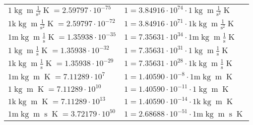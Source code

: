 \begin{center}
\begin{longtable}{l l}
{\color{black}$1 \bm{\mathrm{ }}\operatorname{kg}{\operatorname{m}}\frac1{\operatorname{s}^2}{}{\operatorname{K}} = 2.59797\cdot10^{-75} $}   & {\color{black}$ 1 = 3.84916\cdot10^{74} \cdot 1 \bm{\mathrm{ }}\operatorname{kg}{\operatorname{m}}\frac1{\operatorname{s}^2}{}{\operatorname{K}}$}  \\
{\color{gray}$1 \bm{\mathrm{ k}}\operatorname{kg}{\operatorname{m}}\frac1{\operatorname{s}^2}{}{\operatorname{K}} = 2.59797\cdot10^{-72} $}   & {\color{gray}$ 1 = 3.84916\cdot10^{71} \cdot 1 \bm{\mathrm{ k}}\operatorname{kg}{\operatorname{m}}\frac1{\operatorname{s}^2}{}{\operatorname{K}}$}  \\
{\color{gray}$1 \bm{\mathrm{ m}}\operatorname{kg}{\operatorname{m}}\frac1{\operatorname{s}}{}{\operatorname{K}} = 1.35938\cdot10^{-35} $}   & {\color{gray}$ 1 = 7.35631\cdot10^{34} \cdot 1 \bm{\mathrm{ m}}\operatorname{kg}{\operatorname{m}}\frac1{\operatorname{s}}{}{\operatorname{K}}$}  \\
{\color{black}$1 \bm{\mathrm{ }}\operatorname{kg}{\operatorname{m}}\frac1{\operatorname{s}}{}{\operatorname{K}} = 1.35938\cdot10^{-32} $}   & {\color{black}$ 1 = 7.35631\cdot10^{31} \cdot 1 \bm{\mathrm{ }}\operatorname{kg}{\operatorname{m}}\frac1{\operatorname{s}}{}{\operatorname{K}}$}  \\
{\color{gray}$1 \bm{\mathrm{ k}}\operatorname{kg}{\operatorname{m}}\frac1{\operatorname{s}}{}{\operatorname{K}} = 1.35938\cdot10^{-29} $}   & {\color{gray}$ 1 = 7.35631\cdot10^{28} \cdot 1 \bm{\mathrm{ k}}\operatorname{kg}{\operatorname{m}}\frac1{\operatorname{s}}{}{\operatorname{K}}$}  \\
{\color{gray}$1 \bm{\mathrm{ m}}\operatorname{kg}{\operatorname{m}}{}{}{\operatorname{K}} = 7.11289\cdot10^{7} $}   & {\color{gray}$ 1 = 1.40590\cdot10^{-8} \cdot 1 \bm{\mathrm{ m}}\operatorname{kg}{\operatorname{m}}{}{}{\operatorname{K}}$}  \\
{\color{black}$1 \bm{\mathrm{ }}\operatorname{kg}{\operatorname{m}}{}{}{\operatorname{K}} = 7.11289\cdot10^{10} $}   & {\color{black}$ 1 = 1.40590\cdot10^{-11} \cdot 1 \bm{\mathrm{ }}\operatorname{kg}{\operatorname{m}}{}{}{\operatorname{K}}$}  \\
{\color{gray}$1 \bm{\mathrm{ k}}\operatorname{kg}{\operatorname{m}}{}{}{\operatorname{K}} = 7.11289\cdot10^{13} $}   & {\color{gray}$ 1 = 1.40590\cdot10^{-14} \cdot 1 \bm{\mathrm{ k}}\operatorname{kg}{\operatorname{m}}{}{}{\operatorname{K}}$}  \\
{\color{gray}$1 \bm{\mathrm{ m}}\operatorname{kg}{\operatorname{m}}{\operatorname{s}}{}{\operatorname{K}} = 3.72179\cdot10^{50} $}   & {\color{gray}$ 1 = 2.68688\cdot10^{-51} \cdot 1 \bm{\mathrm{ m}}\operatorname{kg}{\operatorname{m}}{\operatorname{s}}{}{\operatorname{K}}$}  \\

\end{longtable}
\end{center}
